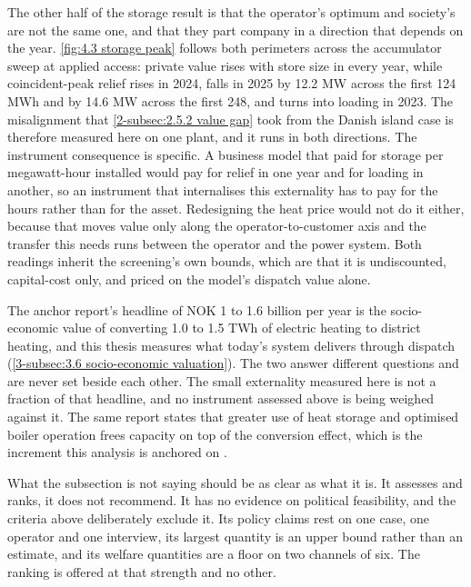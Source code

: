 The other half of the storage result is that the operator's optimum and society's are not the same one, and that they part company in a direction that depends on the year. \autoref{fig:4.3 storage peak} follows both perimeters across the accumulator sweep at applied access: private value rises with store size in every year, while coincident-peak relief rises in 2024, falls in 2025 by 12.2 MW across the first 124 MWh and by 14.6 MW across the first 248, and turns into loading in 2023. The misalignment that \autoref{2-subsec:2.5.2 value gap} took from the Danish island case is therefore measured here on one plant, and it runs in both directions. The instrument consequence is specific. A business model that paid for storage per megawatt-hour installed would pay for relief in one year and for loading in another, so an instrument that internalises this externality has to pay for the hours rather than for the asset. Redesigning the heat price would not do it either, because that moves value only along the operator-to-customer axis and the transfer this needs runs between the operator and the power system. Both readings inherit the screening's own bounds, which are that it is undiscounted, capital-cost only, and priced on the model's dispatch value alone.

The anchor report's headline of NOK 1 to 1.6 billion per year is the socio-economic value of converting 1.0 to 1.5 TWh of electric heating to district heating, and this thesis measures what today's system delivers through dispatch (\autoref{3-subsec:3.6 socio-economic valuation}). The two answer different questions and are never set beside each other. The small externality measured here is not a fraction of that headline, and no instrument assessed above is being weighed against it. The same report states that greater use of heat storage and optimised boiler operation frees capacity on top of the conversion effect, which is the increment this analysis is anchored on \cite{Thema_fjernvarme_2024}.

What the subsection is not saying should be as clear as what it is. It assesses and ranks, it does not recommend. It has no evidence on political feasibility, and the criteria above deliberately exclude it. Its policy claims rest on one case, one operator and one interview, its largest quantity is an upper bound rather than an estimate, and its welfare quantities are a floor on two channels of six. The ranking is offered at that strength and no other.

